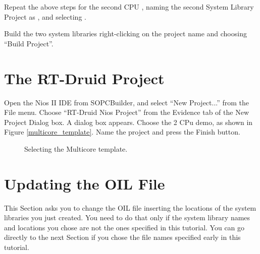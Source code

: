 Repeat the above steps for the second CPU , naming the
second System Library Project as , and
selecting .


Build the two system libraries right-clicking on the project name and
choosing ``Build Project''.


\section{The RT-Druid Project}

Open the Nios II IDE from SOPCBuilder, and select ``New Project...''
from the File menu. Choose ``RT-Druid Nios Project'' from the Evidence
tab of the New Project Dialog box. A dialog box appears.  Choose the 2 CPu demo, as shown in Figure \ref{multicore_template}. Name the
project  and press the Finish button.

%
\begin{figure}


\caption{\label{fig:multicore_template}Selecting the Multicore template. }
\end{figure}




\section{Updating the OIL File}

This Section asks you to change the OIL file inserting the locations
of the system libraries you just created. You need to do that only if
the system library names and locations you chose are not the ones
specified in this tutorial. You can go directly to the next Section if
you chose the file names specified early in this tutorial.

